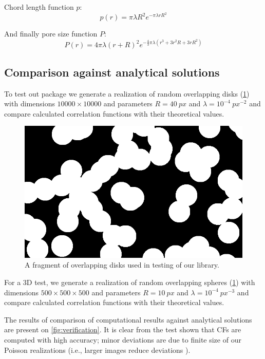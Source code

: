 \documentclass[reprint,amsmath,amssymb,aps,pre,showkeys,showpacs,nofootinbib]{revtex4-1}
\begin{document}
Chord length function $p$:
\begin{equation*}
  p(r) = \pi\lambda R^2 e^{-\pi\lambda rR^2}
\end{equation*}

And finally pore size function $P$:
\begin{equation*}
  P(r) = 4\pi\lambda(r+R)^2 e^{-\frac{4}{3}\pi\lambda (r^3 + 3r^2R + 3rR^2)}
\end{equation*}

\subsection{Comparison against analytical solutions}
To test out package we generate a realization of random overlapping disks
(\cref{fig:overlapping-disks}) with dimensions $10000 \times 10000$ and
parameters $R = 40\ px$ and $\lambda = 10^{-4}\ px^{-2}$ and compare calculated
correlation functions with their theoretical values.
\begin{figure}[ht]
  \centering
  \includegraphics[width=0.9\linewidth]{images/disks-fragment.png}
  \caption[]{A fragment of overlapping disks used in testing of our library.}
  \label{fig:overlapping-disks}
\end{figure}

For a 3D test, we generate a realization of random overlapping spheres
(\cref{fig:overlapping-disks}) with dimensions $500 \times 500 \times 500$ and
parameters $R = 10\ px$ and $\lambda = 10^{-4}\ px^{-3}$ and compare calculated
correlation functions with their theoretical values. 

The results of comparison of computational results against analytical solutions 
are present on \cref{fig:verification}. It is clear from the test shown that CFs 
are computed with high accuracy; minor deviations are due to finite size of our
Poisson realizations (i.e., larger images reduce deviations \cite{samarin2023robust}).
\end{document}
